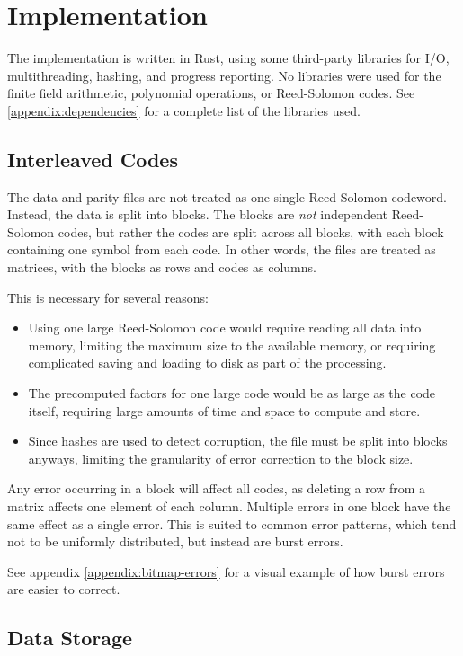 \chapter{Implementation}

The implementation is written in Rust, using some third-party libraries for I/O, multithreading, hashing, and progress reporting. No libraries were used for the finite field arithmetic, polynomial operations, or Reed-Solomon codes.
See \ref{appendix:dependencies} for a complete list of the libraries used.

\section{Interleaved Codes}

The data and parity files are not treated as one single Reed-Solomon codeword.
Instead, the data is split into blocks. The blocks are \textit{not} independent Reed-Solomon codes, but rather the codes are split across all blocks, with each block containing one symbol from each code.
In other words, the files are treated as matrices, with the blocks as rows and codes as columns.

This is necessary for several reasons:
\begin{itemize}
    \item Using one large Reed-Solomon code would require reading all data into memory, limiting the maximum size to the available memory, or requiring complicated saving and loading to disk as part of the processing.
    \item The precomputed factors for one large code would be as large as the code itself, requiring large amounts of time and space to compute and store.
    \item Since hashes are used to detect corruption, the file must be split into blocks anyways, limiting the granularity of error correction to the block size.
\end{itemize}

Any error occurring in a block will affect all codes, as deleting a row from a matrix affects one element of each column.
Multiple errors in one block have the same effect as a single error. This is suited to common error patterns, which tend not to be uniformly distributed, but instead are burst errors.

See appendix \ref{appendix:bitmap-errors} for a visual example of how burst errors are easier to correct.

\section{Data Storage}

